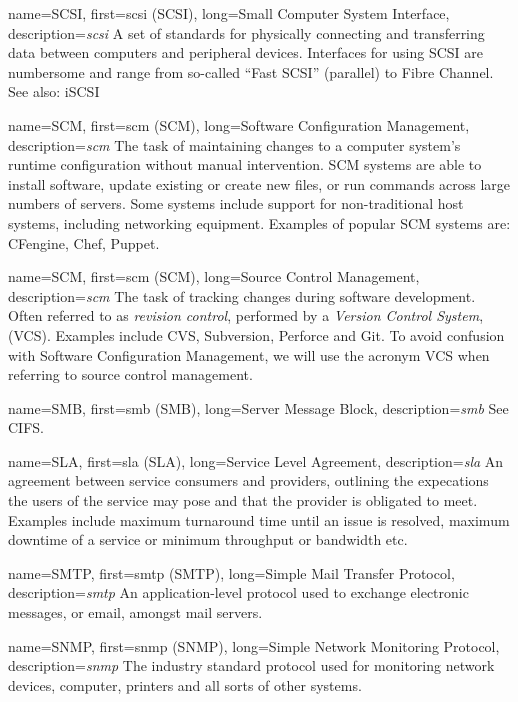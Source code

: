 {
	name={SCSI},
	first={\acrlong{scsi} (SCSI)},
	long={Small Computer System Interface},
	description={{\em \acrlong{scsi}} A set of standards for
physically connecting and transferring data between computers and
peripheral devices.  Interfaces for using SCSI are numbersome and range
from so-called ``Fast SCSI'' (parallel) to Fibre
Channel.  See also: iSCSI}
}

{
	name={SCM},
	first={\acrlong{scm} (SCM)},
	long={Software Configuration Management},
	description={{\em \acrlong{scm}} The task of maintaining
changes to a computer system's runtime configuration without manual
intervention.  SCM systems are able to install software, update existing
or create new files, or run commands across large numbers of servers.
Some systems include support for non-traditional host systems, including
networking equipment.  Examples of popular SCM systems are: CFengine,
Chef, Puppet.}
}

{
	name={SCM},
	first={\acrlong{scm} (SCM)},
	long={Source Control Management},
	description={{\em \acrlong{scm}} The task of tracking changes
during software development.  Often referred to as {\em revision control},
performed by a {\em Version Control System}, (VCS).  Examples include CVS,
Subversion, Perforce and Git. To avoid confusion with Software
Configuration Management, we will use the acronym VCS when referring to
source control management.}
}

{
	name={SMB},
	first={\acrlong{smb} (SMB)},
	long={Server Message Block},
	description={{\em \acrlong{smb}} See CIFS.}
}

{
	name={SLA},
	first={\acrlong{sla} (SLA)},
	long={Service Level Agreement},
	description={{\em \acrlong{sla}} An agreement between service
consumers and providers, outlining the expecations the users of the
service may pose and that the provider is obligated to meet.  Examples
include maximum turnaround time until an issue is resolved, maximum
downtime of a service or minimum throughput or
bandwidth etc.}
}

{
	name={SMTP},
	first={\acrlong{smtp} (SMTP)},
	long={Simple Mail Transfer Protocol},
	description={{\em \acrlong{smtp}} An application-level
protocol used to exchange electronic messages, or email, amongst mail
servers.}
}

{
	name={SNMP},
	first={\acrlong{snmp} (SNMP)},
	long={Simple Network Monitoring Protocol},
	description={{\em \acrlong{snmp}} The industry standard
protocol used for monitoring network devices, computer, printers and all
sorts of other systems.}
}

